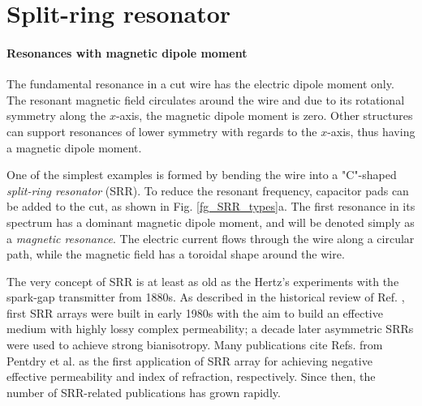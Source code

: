 \FloatBarrier %
\section{Split-ring resonator} \label{section_srr} %
\paragraph{Resonances with magnetic dipole moment}%
The fundamental resonance in a cut wire has the electric dipole moment only. The resonant magnetic field circulates around the wire and due to its rotational symmetry along the $x$-axis, the magnetic dipole moment is zero. Other structures can support resonances of lower symmetry with regards to the $x$-axis, thus having a magnetic dipole moment.

One of the simplest examples is formed by bending the wire into a "C"-shaped \textit{split-ring resonator} (SRR). To reduce the resonant frequency, capacitor pads can be added to the cut, as shown in Fig. \ref{fg_SRR_types}a. The first resonance in its spectrum has a dominant magnetic dipole moment, and will be denoted simply as a \textit{magnetic resonance}. The electric current flows through the wire along a circular path, while the magnetic field has a toroidal shape around the wire.   

The very concept of SRR is at least as old as the Hertz's experiments with the spark-gap transmitter from 1880s.
As described in the historical review of Ref. \cite[pp. 120--126]{solymar2009waves}, first SRR arrays were built in early 1980s with the aim to build an effective medium with highly lossy complex permeability; a decade later asymmetric SRRs were used to achieve strong bianisotropy. Many publications cite Refs. \cite{pendry1999magnetism,pendry2000negative} from Pentdry et al. as the first application of SRR array for achieving negative effective permeability and index of refraction, respectively. Since then, the number of SRR-related publications has grown rapidly. 
\label{negn_srr}

